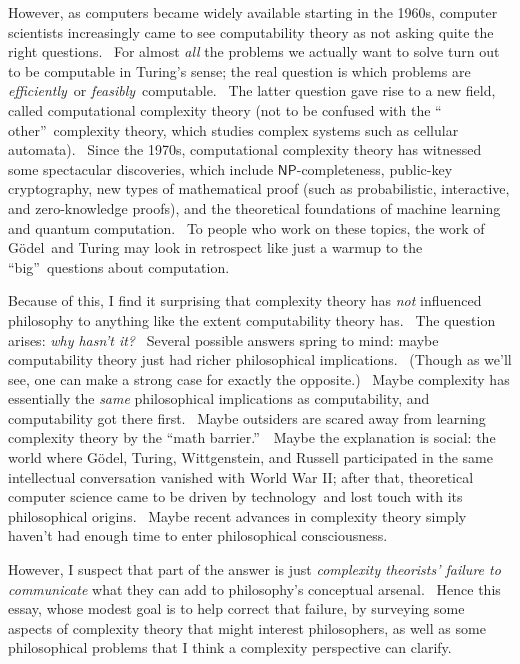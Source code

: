 \documentclass[12pt,onecolumn]{article}%
\begin{document}
However, as computers became widely available starting in the 1960s, computer
scientists increasingly came to see computability theory as not asking quite
the right questions. \ For almost \textit{all} the problems we actually want
to solve turn out to be computable in Turing's sense; the real question is
which problems are \textit{efficiently}\ or \textit{feasibly}\ computable.
\ The latter question gave rise to a new field, called computational
complexity theory (not to be confused with the \textquotedblleft
other\textquotedblright\ complexity theory, which studies complex systems such
as cellular automata). \ Since the 1970s, computational complexity theory has
witnessed some spectacular discoveries, which include $\mathsf{NP}%
$-completeness, public-key cryptography, new types of mathematical proof (such
as probabilistic, interactive, and zero-knowledge proofs), and the theoretical
foundations of machine learning and quantum computation. \ To people who work
on these topics, the work of G\"{o}del\ and Turing may look in retrospect like
just a warmup to the \textquotedblleft big\textquotedblright\ questions about computation.

Because of this, I find it surprising that complexity theory has \textit{not}
influenced philosophy to anything like the extent computability theory has.
\ The question arises: \textit{why hasn't it?} \ Several possible answers
spring to mind: maybe computability theory just had richer philosophical
implications. \ (Though as we'll see, one can make a strong case for exactly
the opposite.) \ Maybe complexity has essentially the \textit{same}
philosophical implications as computability, and computability got there
first. \ Maybe outsiders are scared away from learning complexity theory by
the \textquotedblleft math barrier.\textquotedblright\ \ Maybe the explanation
is social: the world where G\"{o}del, Turing, Wittgenstein, and Russell
participated in the same intellectual conversation vanished with World War II;
after that, theoretical computer science came to be driven by technology\ and
lost touch with its philosophical origins. \ Maybe recent advances in
complexity theory simply haven't had enough time to enter philosophical consciousness.

However, I suspect that part of the answer is just \textit{complexity
theorists' failure to communicate} what they can add to philosophy's
conceptual arsenal. \ Hence this essay, whose modest goal is to help correct
that failure, by surveying some aspects of complexity theory that might
interest philosophers, as well as some philosophical problems that I think a
complexity perspective can clarify.
\end{document}
